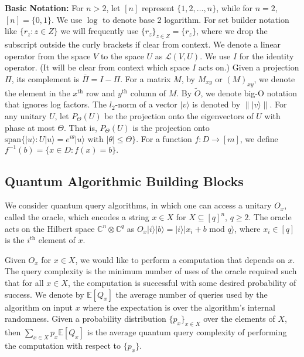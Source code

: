 \documentclass[cleveref, autoref, thm-restate,11pt]{article}
\theoremstyle{definition}
\newcommand{\sop}[1]{{\mathcal #1}}
\newcommand{\ket}[1]{|#1\rangle}
\begin{document}
\textbf{Basic Notation:} 
For $n>2$, let $[n]$ represent $\{1,2,\dots,n\}$, while for $n=2$, $[n]=\{0,1\}$. We use $\log$ to denote base 2 logarithm. For set builder notation like $\{r_z:z\in Z\}$ we will frequently use $\{r_z\}_{z\in Z}=\{r_z\}$, where we drop the subscript
outside the curly brackets if clear from context. We
denote a linear operator from the space $V$ to the space $U$ as $\sop L
(V,U)$. We use $I$ for the identity operator. (It will be clear from context
which space $I$ acts on.) Given a projection $\Pi$, its complement is
$\overline{\Pi}=I-\Pi.$ For a matrix $M$, by $M_{xy}$ or $(M)_{xy}$, we
denote the element in the $x^\textrm{th}$ row and $y^\textrm{th}$ column of $M$. By 
$\tilde{O}$, we denote big-O notation that ignores log factors. The $l_2$-norm of a
vector $\ket{v}$ is denoted by $\|\ket{v}\|$. For any unitary $U$, let
$P_\Theta(U)$ be the projection onto the eigenvectors of $U$ with phase at
most $\Theta$. That is, $P_\Theta(U)$ is the projection onto 
$\textrm{span}\{\ket{u}:U\ket{u}=e^{i\theta}\ket{u}\textrm{ with }|\theta|\leq\Theta\}$. For a function $f:D\rightarrow [m]$, we define $f^{-1}(b)=\{x\in D:f(x)=b\}.$



\subsection{Quantum Algorithmic Building Blocks}

We consider quantum query algorithms, in which one can access
a unitary $O_x$, called the oracle, which encodes a string $x\in X$ for
$X\subseteq [q]^n$, $q\geq 2$. The oracle acts on the
Hilbert space $\mathbb{C}^n\otimes \mathbb{C}^q$ as $O_x\ket{i}\ket{b}=\ket
{i}\ket{x_i+b\textrm{ mod }q}$, where $x_i\in[q]$ is the $i^\textrm{th}$ element of
$x$.

Given $O_x$ for $x\in X$,
we would like to perform a computation that depends on $x$. The query
complexity is the minimum number of uses of the oracle required such that for
all $x\in X$, the computation is successful with some desired probability of
success. We denote by $\mathbb{E}[Q_x]$ the average number of queries used by the algorithm on input $x$ where the expectation is over the algorithm's internal randomness. 
Given a probability distribution $\{p_x\}_{x\in X}$ over the elements of $X$, then 
$\sum_{x\in X}p_x\mathbb{E}[Q_x]$ is the average quantum query complexity of performing the 
computation with respect to $\{p_x\}.$
\end{document}
